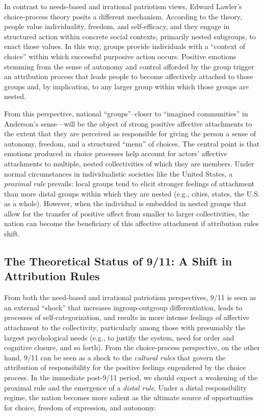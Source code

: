 \documentclass[12pt,letterpaper]{article}
\begin{document}
In contrast to needs-based and irrational patriotism views, Edward Lawler's \citeyearpar{lawler1992affective-8c8} choice-process theory posits a different mechanism. According to the theory, people value individuality, freedom, and self-efficacy, and they engage in structured action within concrete social contexts, primarily nested subgroups, to enact those values. In this way, groups provide individuals with a ``context of choice'' within which successful purposive action occurs. Positive emotions stemming from the sense of autonomy and control afforded by the group trigger an attribution process that leads people to become affectively attached to those groups and, by implication, to any larger group within which those groups are nested.

From this perspective, national ``groups''--closer to ``imagined communities'' in Anderson's \citeyearpar{anderson1991imagined-c99} sense---will be the object of strong positive affective attachments to the extent that they are perceived as responsible for giving the person a sense of autonomy, freedom, and a structured ``menu'' of choices. The central point is that emotions produced in choice processes help account for actors' affective attachments to multiple, nested collectivities of which they are members. Under normal circumstances in individualistic societies like the United States, a \textit{proximal rule} prevails: local groups tend to elicit stronger feelings of attachment than more distal groups within which they are nested (e.g., cities, states, the U.S. as a whole). However, when the individual is embedded in nested groups that allow for the transfer of positive affect from smaller to larger collectivities, the nation can become the beneficiary of this affective attachment if attribution rules shift.

\subsection{The Theoretical Status of 9/11: A Shift in Attribution Rules}

From both the need-based and irrational patriotism perspectives, 9/11 is seen as an external ``shock'' that increases ingroup-outgroup differentiation, leads to processes of self-categorization, and results in more intense feelings of affective attachment to the collectivity, particularly among those with presumably the largest psychological needs (e.g., to justify the system, need for order and cognitive closure, and so forth). From the choice-process perspective, on the other hand, 9/11 can be seen as a shock to the \textit{cultural rules} that govern the attribution of responsibility for the positive feelings engendered by the choice process. In the immediate post-9/11 period, we should expect a weakening of the proximal rule and the emergence of a \textit{distal rule}. Under a distal responsibility regime, the nation becomes more salient as the ultimate source of opportunities for choice, freedom of expression, and autonomy.
\end{document}

